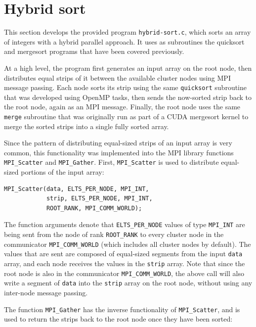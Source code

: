 \documentclass{article}
\theoremstyle{definition}
\begin{document}
\section{Hybrid sort}

This section develops the provided program \texttt{hybrid-sort.c}, which sorts an array of integers with a hybrid parallel approach. It uses as subroutines the quicksort and mergesort programs that have been covered previously. 

At a high level, the program first generates an input array on the root node, then distributes equal strips of it between the available cluster nodes using MPI message passing. Each node sorts its strip using the same \texttt{quicksort} subroutine that was developed using OpenMP tasks, then sends the now-sorted strip back to the root node, again as an MPI message. Finally, the root node uses the same \texttt{merge} subroutine that was originally run as part of a CUDA mergesort kernel to merge the sorted strips into a single fully sorted array.

Since the pattern of distributing equal-sized strips of an input array is very common, this functionality was implemented into the MPI library functions \texttt{MPI\_Scatter} and \texttt{MPI\_Gather}. First, \texttt{MPI\_Scatter} is used to distribute equal-sized portions of the input array:

\begin{verbatim}
MPI_Scatter(data, ELTS_PER_NODE, MPI_INT,
            strip, ELTS_PER_NODE, MPI_INT,
            ROOT_RANK, MPI_COMM_WORLD);
\end{verbatim}

The function arguments denote that \texttt{ELTS\_PER\_NODE} values of type \texttt{MPI\_INT} are being sent from the node of rank \texttt{ROOT\_RANK} to every cluster node in the communicator \texttt{MPI\_COMM\_WORLD} (which includes all cluster nodes by default). The values that are sent are composed of equal-sized segments from the input \texttt{data} array, and each node receives the values in the \texttt{strip} array. Note that since the root node is also in the communicator \texttt{MPI\_COMM\_WORLD}, the above call will also write a segment of \texttt{data} into the \texttt{strip} array on the root node, without using any inter-node message passing.

The function \texttt{MPI\_Gather} has the inverse functionality of \texttt{MPI\_Scatter}, and is used to return the strips back to the root node once they have been sorted:
\end{document}
